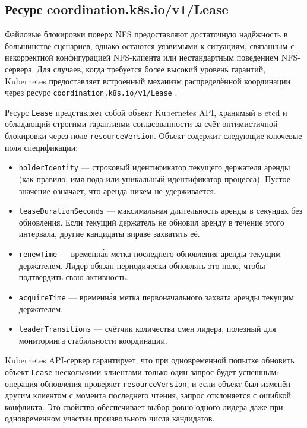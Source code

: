 \subsection*{Ресурс coordination.k8s.io/v1/Lease}

Файловые блокировки поверх NFS предоставляют достаточную надёжность в большинстве сценариев, однако остаются уязвимыми к ситуациям, связанным с некорректной конфигурацией NFS-клиента или нестандартным поведением NFS-сервера. Для случаев, когда требуется более высокий уровень гарантий, Kubernetes предоставляет встроенный механизм распределённой координации через ресурс \texttt{coordination.k8s.io/v1/Lease} \cite{k8s_lease_api}.

Ресурс \texttt{Lease} представляет собой объект Kubernetes API, хранимый в etcd и обладающий строгими гарантиями согласованности за счёт оптимистичной блокировки через поле \texttt{resourceVersion}. Объект содержит следующие ключевые поля спецификации:
\begin{itemize}[leftmargin=*]
  \item \texttt{holderIdentity} --- строковый идентификатор текущего держателя аренды (как правило, имя пода или уникальный идентификатор процесса). Пустое значение означает, что аренда никем не удерживается.
  \item \texttt{leaseDurationSeconds} --- максимальная длительность аренды в секундах без обновления. Если текущий держатель не обновил аренду в течение этого интервала, другие кандидаты вправе захватить её.
  \item \texttt{renewTime} --- временна́я метка последнего обновления аренды текущим держателем. Лидер обязан периодически обновлять это поле, чтобы подтвердить свою активность.
  \item \texttt{acquireTime} --- временна́я метка первоначального захвата аренды текущим держателем.
  \item \texttt{leaderTransitions} --- счётчик количества смен лидера, полезный для мониторинга стабильности координации.
\end{itemize}

Kubernetes API-сервер гарантирует, что при одновременной попытке обновить объект \texttt{Lease} несколькими клиентами только один запрос будет успешным: операция обновления проверяет \texttt{resourceVersion}, и если объект был изменён другим клиентом с момента последнего чтения, запрос отклоняется с ошибкой конфликта. Это свойство обеспечивает выбор ровно одного лидера даже при одновременном участии произвольного числа кандидатов.

